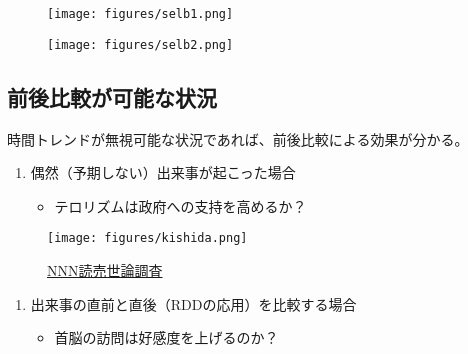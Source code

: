 \documentclass[
  xelatex,
  ja=standard]{bxjsarticle}
\providecommand{\tightlist}{%
  \setlength{\itemsep}{0pt}\setlength{\parskip}{0pt}}\usepackage{longtable,booktabs,array}
\begin{document}
\begin{figure}[htpb]

{\centering \texttt{[image: figures/selb1.png]}

}

\caption{\citet{selb2018}}

\end{figure}

\begin{figure}[htpb]

{\centering \texttt{[image: figures/selb2.png]}

}

\caption{\citet{selb2018}}

\end{figure}

\hypertarget{ux524dux5f8cux6bd4ux8f03ux304cux53efux80fdux306aux72b6ux6cc1}{%
\subsection{前後比較が可能な状況}\label{ux524dux5f8cux6bd4ux8f03ux304cux53efux80fdux306aux72b6ux6cc1}}

時間トレンドが無視可能な状況であれば、前後比較による効果が分かる。

\begin{enumerate}
\def\labelenumi{\arabic{enumi}.}
\tightlist
\item
  偶然（予期しない）出来事が起こった場合

  \begin{itemize}
  \tightlist
  \item
    テロリズムは政府への支持を高めるか？
  \end{itemize}
\end{enumerate}

\begin{figure}[htpb]

{\centering \texttt{[image: figures/kishida.png]}

}

\caption{\href{https://news.yahoo.co.jp/articles/b37de4c74732c92657c5d55d485852f611bc1540}{NNN読売世論調査}}

\end{figure}

\begin{enumerate}
\def\labelenumi{\arabic{enumi}.}
\setcounter{enumi}{1}
\tightlist
\item
  出来事の直前と直後（RDDの応用）を比較する場合

  \begin{itemize}
  \tightlist
  \item
    首脳の訪問は好感度を上げるのか？
  \end{itemize}
\end{enumerate}
\end{document}
